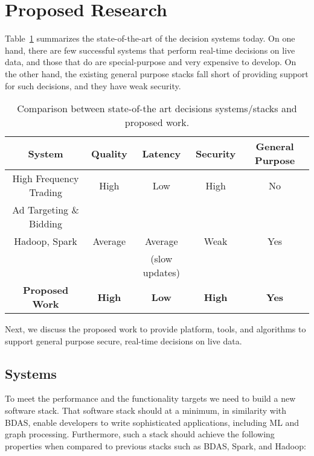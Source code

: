 \section{Proposed Research}

Table~\ref{table:new-work} summarizes the state-of-the-art of the decision systems today. On one hand, there are few successful systems that perform real-time decisions on live data, and those that do are special-purpose and very expensive to develop. On the other hand, the existing general purpose stacks fall short of providing support for such decisions, and they have weak security.

\begin{table}[h]
\begin{center}
\begin{tabular}{ |c|c|c|c|c| } 
 \hline
{\bf System} & {\bf Quality} & {\bf Latency} & {\bf Security} & {\bf General Purpose}\\\hline 
High Frequency Trading & High & Low & High & No \\
Ad Targeting \& Bidding & & & & \\\hline
Hadoop, Spark & Average & Average & Weak & Yes\\
                         &               & (slow updates) & & \\\hline
{\bf Proposed Work} & {\bf High} & {\bf Low} & {\bf High} & {\bf Yes} \\\hline
\end{tabular}
\end{center}
\vskip -0.15in
\caption{\small{Comparison between state-of-the art decisions systems/stacks and proposed work.}}
\label{table:new-work}
\end{table}

Next, we discuss the proposed work to provide platform, tools, and algorithms to support general purpose secure, real-time decisions on live data.  

\subsection{Systems}

To meet the performance and the functionality targets we need to build a new software stack. That software stack should at a minimum, in similarity with BDAS, enable developers to write sophisticated applications, including ML and graph processing. Furthermore, such a stack should achieve the following properties when compared to previous stacks such as BDAS, Spark, and Hadoop:

